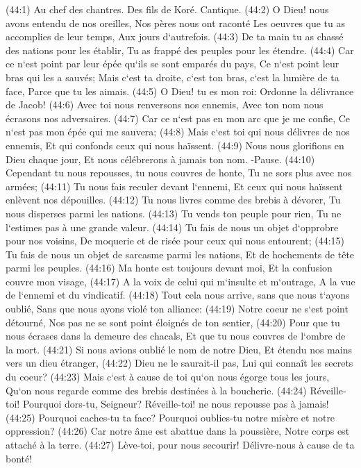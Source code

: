 \verse (44:1) Au chef des chantres. Des fils de Koré. Cantique. (44:2) O Dieu! nous avons entendu de nos oreilles, Nos pères nous ont raconté Les oeuvres que tu as accomplies de leur temps, Aux jours d`autrefois. 
\verse (44:3) De ta main tu as chassé des nations pour les établir, Tu as frappé des peuples pour les étendre. 
\verse (44:4) Car ce n`est point par leur épée qu`ils se sont emparés du pays, Ce n`est point leur bras qui les a sauvés; Mais c`est ta droite, c`est ton bras, c`est la lumière de ta face, Parce que tu les aimais. 
\verse (44:5) O Dieu! tu es mon roi: Ordonne la délivrance de Jacob! 
\verse (44:6) Avec toi nous renversons nos ennemis, Avec ton nom nous écrasons nos adversaires. 
\verse (44:7) Car ce n`est pas en mon arc que je me confie, Ce n`est pas mon épée qui me sauvera; 
\verse (44:8) Mais c`est toi qui nous délivres de nos ennemis, Et qui confonds ceux qui nous haïssent. 
\verse (44:9) Nous nous glorifions en Dieu chaque jour, Et nous célébrerons à jamais ton nom. -Pause. 
\verse (44:10) Cependant tu nous repousses, tu nous couvres de honte, Tu ne sors plus avec nos armées; 
\verse (44:11) Tu nous fais reculer devant l`ennemi, Et ceux qui nous haïssent enlèvent nos dépouilles. 
\verse (44:12) Tu nous livres comme des brebis à dévorer, Tu nous disperses parmi les nations. 
\verse (44:13) Tu vends ton peuple pour rien, Tu ne l`estimes pas à une grande valeur. 
\verse (44:14) Tu fais de nous un objet d`opprobre pour nos voisins, De moquerie et de risée pour ceux qui nous entourent; 
\verse (44:15) Tu fais de nous un objet de sarcasme parmi les nations, Et de hochements de tête parmi les peuples. 
\verse (44:16) Ma honte est toujours devant moi, Et la confusion couvre mon visage, 
\verse (44:17) A la voix de celui qui m`insulte et m`outrage, A la vue de l`ennemi et du vindicatif. 
\verse (44:18) Tout cela nous arrive, sans que nous t`ayons oublié, Sans que nous ayons violé ton alliance: 
\verse (44:19) Notre coeur ne s`est point détourné, Nos pas ne se sont point éloignés de ton sentier, 
\verse (44:20) Pour que tu nous écrases dans la demeure des chacals, Et que tu nous couvres de l`ombre de la mort. 
\verse (44:21) Si nous avions oublié le nom de notre Dieu, Et étendu nos mains vers un dieu étranger, 
\verse (44:22) Dieu ne le saurait-il pas, Lui qui connaît les secrets du coeur? 
\verse (44:23) Mais c`est à cause de toi qu`on nous égorge tous les jours, Qu`on nous regarde comme des brebis destinées à la boucherie. 
\verse (44:24) Réveille-toi! Pourquoi dors-tu, Seigneur? Réveille-toi! ne nous repousse pas à jamais! 
\verse (44:25) Pourquoi caches-tu ta face? Pourquoi oublies-tu notre misère et notre oppression? 
\verse (44:26) Car notre âme est abattue dans la poussière, Notre corps est attaché à la terre. 
\verse (44:27) Lève-toi, pour nous secourir! Délivre-nous à cause de ta bonté! 

